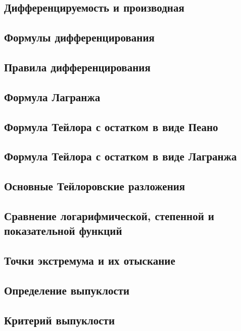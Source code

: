 \subsection{Дифференцируемость и производная}

\skip
\subsection{Формулы дифференцирования}

\skip
\subsection{Правила дифференцирования}

\skip
\subsection{Формула Лагранжа}

\skip
\subsection{Формула Тейлора с остатком в виде Пеано}

\skip
\subsection{Формула Тейлора с остатком в виде Лагранжа}

\skip
\subsection{Основные Тейлоровские разложения}

\skip
\subsection{Сравнение логарифмической, степенной и показательной функций}

\skip
\subsection{Точки экстремума и их отыскание}

\skip
\subsection{Определение выпуклости}

\skip
\subsection{Критерий выпуклости}

\skip
